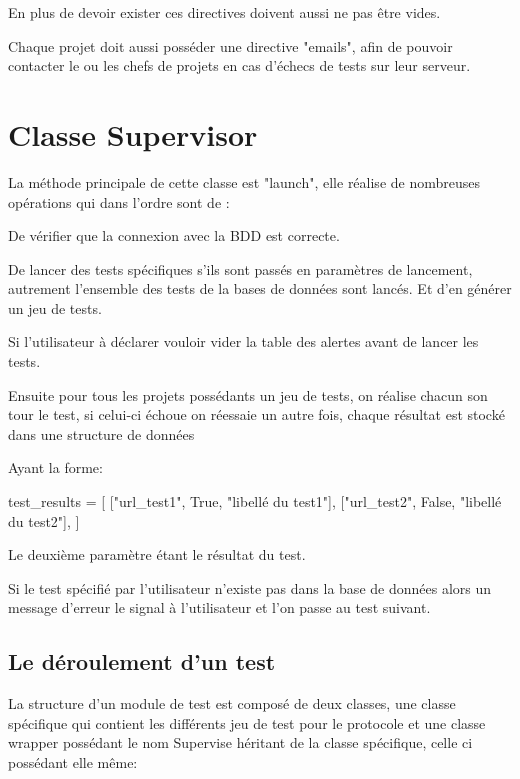 En plus de devoir exister ces directives doivent aussi ne pas être vides.

Chaque projet doit aussi posséder une directive "emails", afin de pouvoir contacter le ou les chefs de projets en cas d'échecs de tests sur leur serveur.


\newpage

\section*{Classe Supervisor}

La méthode principale de cette classe est "launch", elle réalise de nombreuses opérations qui dans l'ordre sont de :

De vérifier que la connexion avec la BDD est correcte.

De lancer des tests spécifiques s'ils sont passés en paramètres de lancement, autrement l'ensemble des tests de la bases de données sont lancés. Et d'en générer un jeu de tests.

Si l'utilisateur à déclarer vouloir vider la table des alertes avant de lancer les tests.

Ensuite pour tous les projets possédants un jeu de tests, on réalise chacun son tour le test, si celui-ci échoue on réessaie un autre fois, chaque résultat est stocké dans une structure de données


Ayant la forme:
\begin{python}
test_results = [
	["url_test1", True, "libellé du test1"],
	["url_test2", False, "libellé du test2"],
]
\end{python}

Le deuxième paramètre étant le résultat du test.

Si le test spécifié par l'utilisateur n'existe pas dans la base de données alors un message d'erreur le signal à l'utilisateur et l'on passe au test suivant.

\subsection*{Le déroulement d'un test}

La structure d'un module de test est composé de deux classes, une classe spécifique qui contient les différents jeu de test pour le protocole et une classe wrapper possédant le nom Supervise héritant de la classe spécifique, celle ci possédant elle même:

